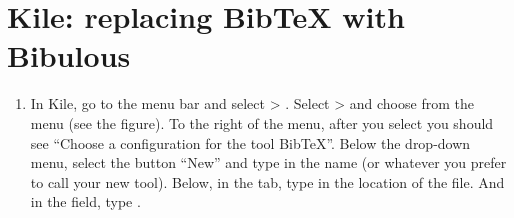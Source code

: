 \documentclass[letterpaper,10pt,english]{sphinxmanual}
\begin{document}
\section{Kile: replacing BibTeX with Bibulous}
\label{\detokenize{getting_started:kile-replacing-bibtex-with-bibulous}}\begin{enumerate}
\item {} 
In Kile, go to the menu bar and select  \textgreater{} . Select  \textgreater{}  and choose  from the  menu (see the figure). To the right of the menu, after you select  you should see “Choose a configuration for the tool BibTeX”. Below the drop-down menu, select the button “New” and type in the name  (or whatever you prefer to call your new tool). Below, in the  tab, type in the location of the  file. And in the  field, type .

\end{enumerate}

\noindent{}

\noindent{}
\end{document}
